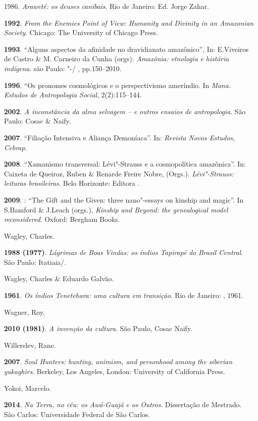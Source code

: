 \begin{Parskip}
1986. \emph{Araweté: os deuses canibais}. Rio de Janeiro: Ed. Jorge
Zahar.

\textbf{1992}. \emph{From the Enemies Point of View: Humanity and
Divinity in an Amazonian Society}. Chicago: The University of Chicago
Press.

\textbf{1993}. ``Alguns aspectos da afinidade no dravidianato amazônico'',
In: E.Viveiros de Castro \& M. Carneiro da Cunha (orgs). \emph{Amazônia:
etnologia e história indígena}. são Paulo: "-/ ,
pp.150--2010.

\textbf{1996}. ``Os pronomes cosmológicos e o perspectivismo ameríndio.
In \emph{Mana}. \emph{Estudos de Antropologia Social}, 2(2):115--144.

\textbf{2002}. \emph{A inconstância da alma selvagem -- e outros ensaios
de antropologia}. São Paulo: Cosac \& Naify.

\textbf{2007}. ``Filiação Intensiva e Aliança Demoníaca''. In:
\emph{Revista Novos Estudos, Cebrap}.

\textbf{2008}. ``Xamanismo transversal: Lévi"-Strauss e a cosmopolítica
amazônica''. In: Caixeta de Queiroz, Ruben \& Renarde Freire Nobre,
(Orgs.). \emph{Lévi"-Strauss: leituras brasileiras}. Belo Horizonte:
Editora .

\textbf{2009}. : ``The Gift and the Given: three nano"-essays on kinship
and magic''. In S.Bamford \& J.Leach (orgs.), \emph{Kinship and Beyond:
the genealogical model reconsidered}. Oxford: Bergham Books.

Wagley, Charles.

\textbf{1988 (1977)}. \emph{Lágrimas de Boas Vindas: os índios Tapirapé
do Brasil Central}. São Paulo: Itatiaia/.

Wagley, Charles \& Eduardo Galvão.

\textbf{1961}. \emph{Os índios Tenetehara: uma cultura em transição}.
Rio de Janeiro: , 1961.

Wagner, Roy.

\textbf{2010 (1981)}. \emph{A invenção da cultura}. São Paulo, Cosac
Naify.

Willerslev, Rane.

\textbf{2007}. \emph{Soul Hunters: hunting, animism, and personhood
among the siberian yukaghirs}. Berkeley, Los Angeles, London: University
of California Press.

Yokoi, Marcelo.

\textbf{2014}. \emph{Na Terra, no céu: os Awá-Guajá e os Outros}.
Dissertação de Mestrado. São Carlos: Universidade Federal de São Carlos.


\end{Parskip}
